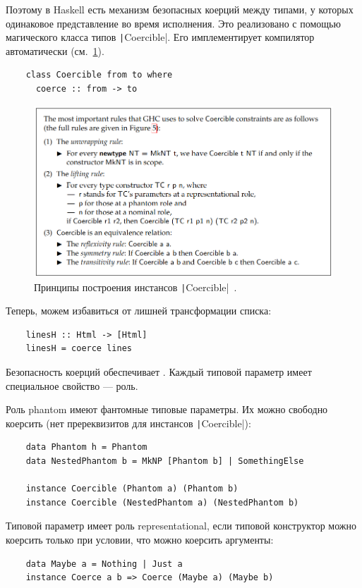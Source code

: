 Поэтому в Haskell есть механизм безопасных коерций между типами, у которых одинаковое представление во время исполнения.
Это реализовано с помощью магического класса типов \texttt|Coercible|.
Его имплементирует компилятор автоматически (см.~\ref{fig:coersions}).
\begin{verbatim}
    class Coercible from to where
      coerce :: from -> to
\end{verbatim}

\begin{figure}[h]
    \centering
    \includegraphics[width=\linewidth]{figs/coersions}
    \caption{Принципы построения инстансов \texttt|Coercible|~\cite{breitner2014safe}.}
    \label{fig:coersions}
\end{figure}

Теперь, можем избавиться от лишней трансформации списка:
\begin{verbatim}
    linesH :: Html -> [Html]
    linesH = coerce lines
\end{verbatim}

Безопасность коерций обеспечивает .
Каждый типовой параметр имеет специальное свойство --- роль.

Роль phantom имеют фантомные типовые параметры.
Их можно свободно коерсить (нет пререквизитов для инстансов \texttt|Coercible|):
\begin{verbatim}
    data Phantom h = Phantom
    data NestedPhantom b = MkNP [Phantom b] | SomethingElse

    instance Coercible (Phantom a) (Phantom b)
    instance Coercible (NestedPhantom a) (NestedPhantom b)
\end{verbatim}

Типовой параметр имеет роль representational, если типовой конструктор можно коерсить только при условии, что можно коерсить аргументы:
\begin{verbatim}
    data Maybe a = Nothing | Just a
    instance Coerce a b => Coerce (Maybe a) (Maybe b)
\end{verbatim}

